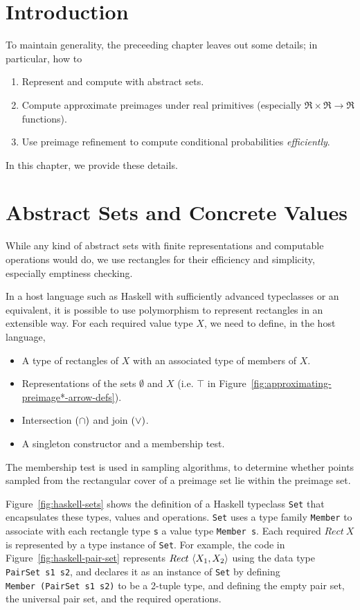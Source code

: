 
\DeclarePairedDelimiter{\ivl}{[\mspace{-4.5mu}(}{)\mspace{-4.5mu}]}

\section{Introduction}

To maintain generality, the preceeding chapter leaves out some details; in particular, how to
\begin{enumerate}
	\item Represent and compute with abstract sets.
	\item Compute approximate preimages under real primitives (especially $\Re \times \Re \to \Re$ functions).
	\item Use preimage refinement to compute conditional probabilities \emph{efficiently}.
\end{enumerate}
In this chapter, we provide these details.

\section{Abstract Sets and Concrete Values}

While any kind of abstract sets with finite representations and computable operations would do, we use rectangles for their efficiency and simplicity, especially emptiness checking.

In a host language such as Haskell with sufficiently advanced typeclasses or an equivalent, it is possible to use polymorphism to represent rectangles in an extensible way.
For each required value type $X$, we need to define, in the host language,
\begin{itemize}
	\item A type of rectangles of $X$ with an associated type of members of $X$.
	\item Representations of the sets $\emptyset$ and $X$ (i.e. $\top$ in Figure~\ref{fig:approximating-preimage*-arrow-defs}).
	\item Intersection $(\cap)$ and join $(\vee)$.
	\item A singleton constructor and a membership test.
\end{itemize}
The membership test is used in sampling algorithms, to determine whether points sampled from the rectangular cover of a preimage set lie within the preimage set.

Figure~\ref{fig:haskell-sets} shows the definition of a Haskell typeclass \texttt{Set} that encapsulates these types, values and operations.
\texttt{Set} uses a type family \texttt{Member} to associate with each rectangle type \texttt{s} a value type \texttt{Member~s}.
Each required $Rect~X$ is represented by a type instance of \texttt{Set}.
For example, the code in Figure~\ref{fig:haskell-pair-set} represents $Rect~\langle{X_1,X_2}\rangle$ using the data type \texttt{PairSet~s1~s2}, and declares it as an instance of \texttt{Set} by defining \texttt{Member~(PairSet~s1~s2)} to be a 2-tuple type, and defining the empty pair set, the universal pair set, and the required operations.

